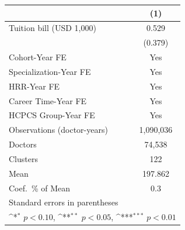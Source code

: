 {
\def\sym#1{\ifmmode^{#1}\else\(^{#1}\)\fi}
\begin{tabular}{l*{1}{c}}
\hline\hline
                    &\multicolumn{1}{c}{(1)}         \\
\hline
Tuition bill (USD 1,000)&       0.529         \\
                    &     (0.379)         \\
[1em]
Cohort-Year FE      &         Yes         \\
[1em]
Specialization-Year FE&         Yes         \\
[1em]
HRR-Year FE         &         Yes         \\
[1em]
Career Time-Year FE &         Yes         \\
[1em]
HCPCS Group-Year FE &         Yes         \\
\hline
Observations (doctor-years)&   1,090,036         \\
Doctors             &      74,538         \\
Clusters            &         122         \\
Mean                &     197.862         \\
Coef.\ \% of Mean   &         0.3         \\
\hline\hline
\multicolumn{2}{l}{\footnotesize Standard errors in parentheses}\\
\multicolumn{2}{l}{\footnotesize \sym{*} \(p<0.10\), \sym{**} \(p<0.05\), \sym{***} \(p<0.01\)}\\
\end{tabular}
}
